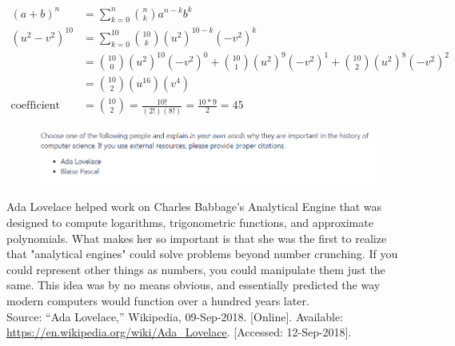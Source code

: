 \documentclass{article}
\begin{document}
\begin{large}
\begingroup
\addtolength{\jot}{1em}
\begin{align*}
    (a+b)^n &= \sum_{k=0}^{n} \binom{n}{k} a^{n-k}b^{k} \\
    (u^2-v^2)^{10} &= \sum_{k=0}^{10} \binom{10}{k} (u^2)^{10-k}(-v^2)^{k} \\
                   &= \binom{10}{0} (u^2)^{10}(-v^2)^{0} + \binom{10}{1} (u^2)^{9}(-v^2)^{1} 
                   + \boxed{\binom{10}{2} (u^2)^{8}(-v^2)^{2}} \\
                   &= \binom{10}{2} (u^{16})(v^4) \\
                   \text{coefficient} &= \binom{10}{2}
                   = \frac{10!}{(2!)(8!)}
                   = \frac{10*9}{2} = 45
\end{align*}
\endgroup

\clearpage
\header

\begin{figure}[h]
\includegraphics[scale = 1]{HW2Prob7}
\centering
\end{figure}

Ada Lovelace helped work on Charles Babbage's Analytical Engine that was designed to compute logarithms, 
trigonometric functions, and approximate polynomials. What makes her so important is that she was the first
to realize that "analytical engines" could solve problems beyond number crunching. If you could represent other
things as numbers, you could manipulate them just the same. This idea was by no means obvious, and essentially
predicted the way modern computers would function over a hundred years later. \\


Source: “Ada Lovelace,” Wikipedia, 09-Sep-2018. [Online]. Available: \url{https://en.wikipedia.org/wiki/Ada_Lovelace}. [Accessed: 12-Sep-2018].


\end{large}
\end{document}
